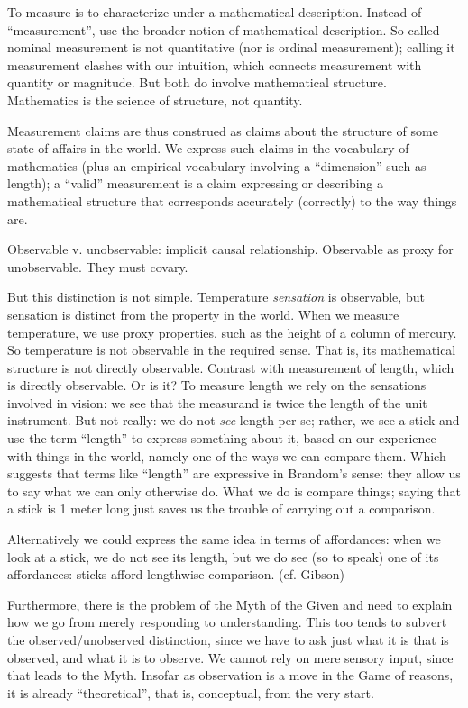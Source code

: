 \documentclass[11pt,twoside]{article}
\begin{document}
To measure is to characterize under a mathematical description.
Instead of ``measurement'', use the broader notion of mathematical
description.  So-called nominal measurement is not quantitative (nor
is ordinal measurement); calling it measurement clashes with our
intuition, which connects measurement with quantity or magnitude.  But
both do involve mathematical structure.  Mathematics is the science of
structure, not quantity.

Measurement claims are thus construed as claims about the structure of
some state of affairs in the world.  We express such claims in the
vocabulary of mathematics (plus an empirical vocabulary involving a
``dimension'' such as length); a ``valid'' measurement is a claim
expressing or describing a mathematical structure that corresponds
accurately (correctly) to the way things are.

Observable v. unobservable: implicit causal relationship.  Observable
as proxy for unobservable.  They must covary.

But this distinction is not simple.  Temperature \textit{sensation} is
observable, but sensation is distinct from the property in the world.
When we measure temperature, we use proxy properties, such as the
height of a column of mercury.  So temperature is not observable in
the required sense.  That is, its mathematical structure is not
directly observable.  Contrast with measurement of length, which is
directly observable.  Or is it?  To measure length we rely on the
sensations involved in vision: we see that the measurand is twice the
length of the unit instrument.  But not really: we do not \textit{see}
length per se; rather, we see a stick and use the term ``length'' to
express something about it, based on our experience with things in the
world, namely one of the ways we can compare them.  Which suggests
that terms like ``length'' are expressive in Brandom's sense: they
allow us to say what we can only otherwise do.  What we do is compare
things; saying that a stick is 1 meter long just saves us the trouble
of carrying out a comparison.

Alternatively we could express the same idea in terms of affordances:
when we look at a stick, we do not see its length, but we do see (so
to speak) one of its affordances: sticks afford lengthwise
comparison. (cf. Gibson)

Furthermore, there is the problem of the Myth of the Given and need to
explain how we go from merely responding to understanding.  This too
tends to subvert the observed/unobserved distinction, since we have to
ask just what it is that is observed, and what it is to observe.  We
cannot rely on mere sensory input, since that leads to the Myth.
Insofar as observation is a move in the Game of reasons, it is already
``theoretical'', that is, conceptual, from the very start.
\end{document}
